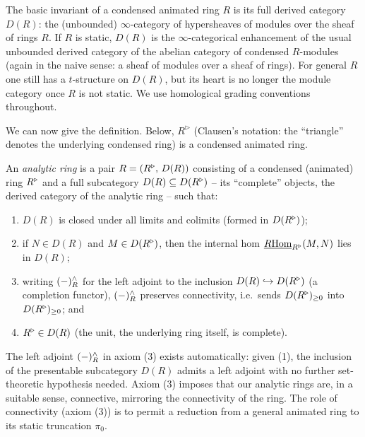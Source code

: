 \begin{definition}
\label{def:1:derived-category}
The basic invariant of a condensed animated ring $R$ is its full derived category
$D(R)$: the (unbounded) $\infty$-category of hypersheaves of modules over the
sheaf of rings $R$. If $R$ is static, $D(R)$ is the $\infty$-categorical
enhancement of the usual unbounded derived category of the abelian category of
condensed $R$-modules (again in the naive sense: a sheaf of modules over a sheaf
of rings). For general $R$ one still has a $t$-structure on $D(R)$, but its heart
is no longer the module category once $R$ is not static. We use homological
grading conventions throughout.
\end{definition}

We can now give the definition. Below, $R^{\triangleright}$ (Clausen's notation:
the ``triangle'' denotes the underlying condensed ring) is a condensed animated
ring.

\begin{definition}
\label{def:1:analytic-ring}
An \emph{analytic ring} is a pair $R=(R^{\triangleright},\,D(R))$ consisting of a condensed
(animated) ring $R^{\triangleright}$ and a full subcategory $D(R)\subseteq D(R^{\triangleright})$ --
its ``complete'' objects, the derived category of the analytic ring -- such
that:
\begin{enumerate}
\item $D(R)$ is closed under all limits and colimits (formed in $D(R^{\triangleright})$);
\item if $N\in D(R)$ and $M\in D(R^{\triangleright})$, then the internal hom
$\underline{R\mathrm{Hom}}_{R^{\triangleright}}(M,N)$ lies in $D(R)$;
\item writing $(-)^{\wedge}_R$ for the left adjoint to the inclusion
$D(R)\hookrightarrow D(R^{\triangleright})$ (a completion functor), $(-)^{\wedge}_R$ preserves
connectivity, i.e.\ sends $D(R^{\triangleright})_{\geq 0}$ into $D(R^{\triangleright})_{\geq 0}$; and
\item $R^{\triangleright}\in D(R)$ (the unit, the underlying ring itself, is complete).
\end{enumerate}
\end{definition}

\begin{remark}
\label{rmk:1:left-adjoint-automatic}
The left adjoint $(-)^{\wedge}_R$ in axiom (3) exists automatically: given (1), the
inclusion of the presentable subcategory $D(R)$ admits a left adjoint with no
further set-theoretic hypothesis needed. Axiom (3) imposes that our analytic rings
are, in a suitable sense, connective, mirroring the connectivity of the ring.
The role of connectivity (axiom (3)) is to permit a reduction from a general
animated ring to its static truncation $\pi_0$.
\end{remark}

